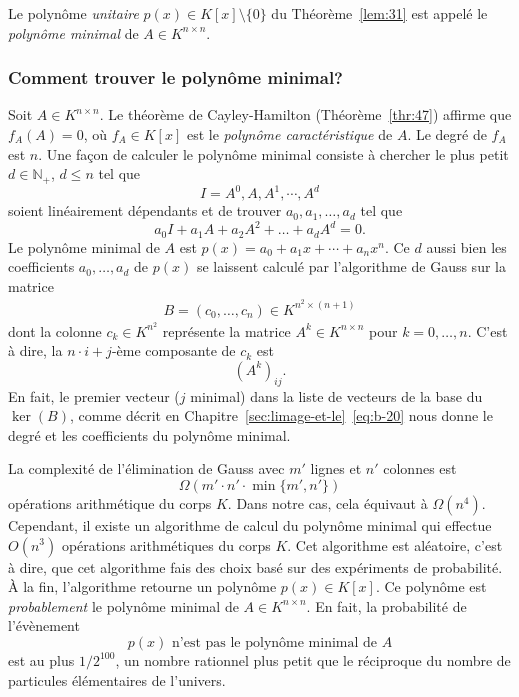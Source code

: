 \begin{definition}
\label{def:67}
Le polynôme \emph{unitaire} $p(x) ∈ K[x]\setminus \{0\}$ du Théorème~\ref{lem:31} est appelé le \emph{polynôme minimal} de $A ∈ K^{n ×n}$.
\end{definition}

\subsubsection{Comment trouver  le polynôme minimal?}
\label{sec:an-algor-aleat}

Soit $A  ∈ K^{ n ×n}$. 
Le théorème de Cayley-Hamilton (Théorème~\ref{thr:47}) affirme que $f_A(A) = 0$, où $f_A \in K[x]$ est le \emph{polynôme caractéristique} de $A$. Le degré de $f_A$ est $n$. 
  Une façon de calculer le polynôme minimal consiste à chercher le plus petit $d \in \mathbb{N}_+$, $d \leq n$ tel que
  \begin{displaymath}
    I = A^0, A, A^1, \cdots, A^d
  \end{displaymath}
  soient linéairement dépendants et de trouver $a_0,a_1, \dots, a_d$ tel que
  \begin{equation}
    \label{eq:60}
     a_0 I +  a_1 A + a_2 A^2+ \dots + a_d A^d = 0.
   \end{equation}
Le polynôme minimal de $A$ est $p(x) = a_0 + a_1x + \cdots + a_n x^n$. 
Ce $d$ aussi bien les coefficients $a_0,\dots,a_d$ de $p(x)$ se laissent calculé par l'algorithme de Gauss sur la matrice
\begin{eqnarray}
  \label{eq:61}
  B = \left(c_0,\dots,c_n\right) ∈ K^{n^2 × (n+1)} 
\end{eqnarray}
dont la colonne $c_k ∈ K^{n^2}$ représente la matrice $A^k ∈ K^{n ×n}$ pour $k=0,\dots,n$. C'est à dire, la  $n ⋅ i + j$-ème composante  de  $c_k$ est 
\begin{equation}
  \label{eq:62}
  (A^k)_{ij}. 
\end{equation}
En fait, le premier vecteur ($j$ minimal) dans la liste de vecteurs de la base du $\ker(B)$, comme décrit en Chapitre~\ref{sec:limage-et-le}~\eqref{eq:b-20} nous donne le degré et les coefficients du polynôme minimal. 


La complexité de l'élimination de Gauss avec $m'$ lignes et $n'$ colonnes est
\begin{displaymath}
   Ω(m' \cdot n' \cdot \min\{m',n'\})
\end{displaymath}
opérations arithmétique du corps $K$. Dans notre cas, cela équivaut à $Ω(n^4)$. Cependant, il existe un algorithme de calcul du polynôme minimal qui effectue   $O(n^3)$ opérations arithmétiques du corps $K$. Cet algorithme est aléatoire, c'est à dire, que cet algorithme fais des choix basé sur des expériments de probabilité. À la fin, l'algorithme retourne  un polynôme $p(x) ∈ K[x]$. Ce polynôme est \emph{probablement} le polynôme minimal de $A ∈ K^{n ×n}$. En fait, la probabilité de l'évènement
\begin{displaymath}
  p(x) \text{ n'est pas le polynôme minimal de } A 
\end{displaymath}
est au plus $1/2^{100}$, un nombre rationnel plus petit que le réciproque du nombre de particules élémentaires de l'univers.  


